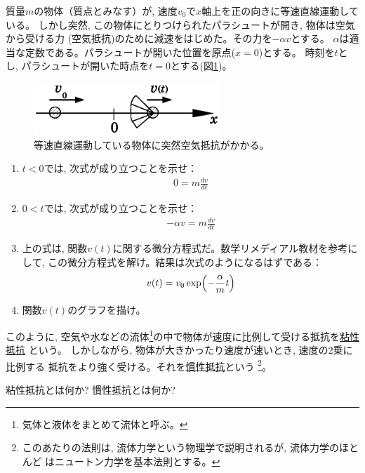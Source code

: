 \begin{q}\label{q:parachute}
質量$m$の物体（質点とみなす）が, 速度$v_0$で$x$軸上を正の向きに等速直線運動している。
しかし突然, この物体にとりつけられたパラシュートが開き, 物体は空気から受ける力
(空気抵抗)のために減速をはじめた。その力を$-\alpha v$とする。
$\alpha$は適当な定数である。パラシュートが開いた位置を原点($x=0$)とする。
時刻を$t$とし, パラシュートが開いた時点を$t=0$とする(図\ref{fig:parachute})。
\begin{figure}[h]
    \centering
    \includegraphics[width=7cm]{parachute.eps}
    \caption{等速直線運動している物体に突然空気抵抗がかかる。}\label{fig:parachute}
\end{figure}
\begin{enumerate}
\item $t<0$では, 次式が成り立つことを示せ：
\begin{eqnarray}
0=m\frac{dv}{dt}\label{eq:friction_stop1}
\end{eqnarray}
\item $0<t$では, 次式が成り立つことを示せ：
\begin{eqnarray}
-\alpha v=m\frac{dv}{dt}\label{eq:friction_stop2}
\end{eqnarray}
\item 上の式は, 関数$v(t)$に関する微分方程式だ。数学リメディアル教材を参考にして, 
この微分方程式を解け。結果は次式のようになるはずである：
\begin{eqnarray}
v(t)=v_0\exp\Bigl(-\frac{\alpha}{m}t\Bigr)\label{eq:stop_viscosity}
\end{eqnarray}
\item 関数$v(t)$のグラフを描け。
\end{enumerate}
\end{q}

このように, 空気や水などの流体\footnote{気体と液体をまとめて流体と呼ぶ。}の中で物体が速度に比例して受ける抵抗を\underline{粘性抵抗}
という。
しかしながら, 物体が大きかったり速度が速いとき, 速度の2乗に比例する
抵抗をより強く受ける。それを\underline{慣性抵抗}という
\footnote{このあたりの法則は, 流体力学という物理学で説明されるが, 流体力学のほとんど
はニュートン力学を基本法則とする。}。\mv

%
\begin{q}\label{q:resistance}
粘性抵抗とは何か? 慣性抵抗とは何か?
\end{q}
\mv

